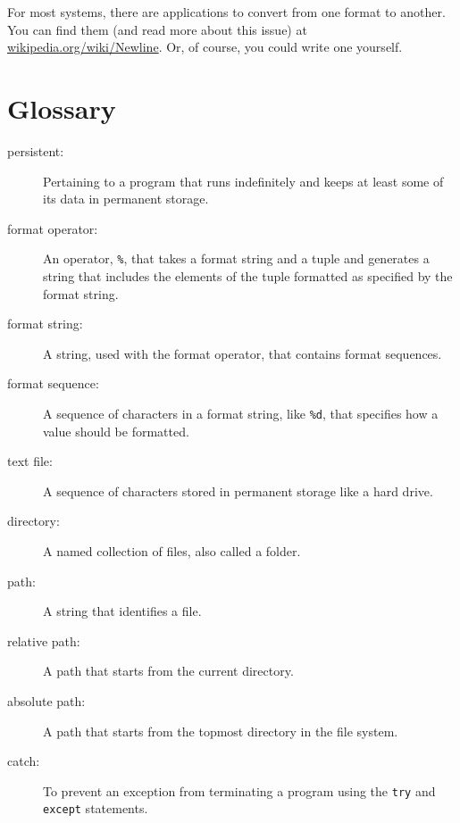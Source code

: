 \documentclass[10pt]{book}
\begin{document}
{

For most systems, there are applications to convert from one
format to another.  You can find them (and read more about this
issue) at \url{wikipedia.org/wiki/Newline}.  Or, of course, you
could write one yourself.


\section{Glossary}

\begin{description}

\item[persistent:] Pertaining to a program that runs indefinitely
and keeps at least some of its data in permanent storage.

\item[format operator:] An operator, {\tt \%}, that takes a format
string and a tuple and generates a string that includes
the elements of the tuple formatted as specified by the format string.

\item[format string:] A string, used with the format operator, that
contains format sequences.  

\item[format sequence:] A sequence of characters in a format string,
like {\tt \%d}, that specifies how a value should be formatted.

\item[text file:] A sequence of characters stored in permanent
storage like a hard drive.

\item[directory:] A named collection of files, also called a folder.

\item[path:] A string that identifies a file.

\item[relative path:] A path that starts from the current directory.

\item[absolute path:] A path that starts from the topmost directory
in the file system.

\item[catch:] To prevent an exception from terminating
a program using the {\tt try}
and {\tt except} statements.


\end{description}}
\end{document}
